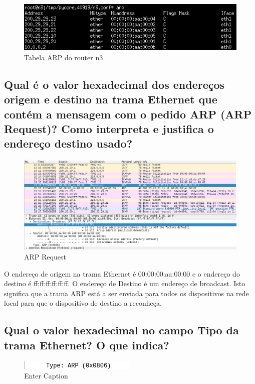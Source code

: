 \begin{figure} [h]
    \centering
    \includegraphics[width=1\linewidth]{tabela-arp-n3.png}
    \caption{Tabela ARP do router n3}
    \label{fig:enter-label}
\end{figure}

\subsection{Qual é o valor hexadecimal dos endereços origem e destino na trama Ethernet que contém a mensagem com o pedido ARP (ARP Request)? Como interpreta e justifica o endereço destino usado?}

\begin{figure} [h]
    \centering
    \includegraphics[width=1\linewidth]{arp-request-1.png}
    \caption{ARP Request}
    \label{fig:enter-label}
\end{figure}

O endereço de origem na trama Ethernet é 00:00:00:aa:00:00 e o endereço do destino é ff:ff:ff:ff:ff:ff. O endereço de Destino é um endereço de broadcast. Isto significa que a trama ARP está a ser enviada para todos os dispositivos na rede local para que o dispositivo de destino a reconheça. 

\subsection{Qual o valor hexadecimal no campo Tipo da trama Ethernet? O que indica?}


\begin{figure} [h]
    \centering
    \includegraphics[width=0.5\linewidth]{tipo-arp-request.png}
    \caption{Enter Caption}
    \label{fig:enter-label}
\end{figure}

